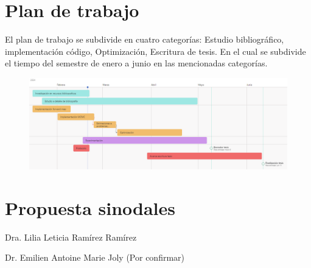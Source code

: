\documentclass{article}
\begin{document}
\section{Plan de trabajo}

El plan de trabajo se subdivide en cuatro categorías: Estudio bibliográfico, implementación código, Optimización, Escritura de tesis. En el cual se subdivide el tiempo del semestre de enero a junio en las mencionadas categorías.

\begin{figure}
    \centering 
    \includegraphics[width = 15 cm]{Figures/cronograma.png} 
\end{figure} 


\section{Propuesta sinodales}

Dra. Lilia Leticia Ramírez Ramírez

Dr. Emilien Antoine Marie Joly (Por confirmar)























\end{document}
